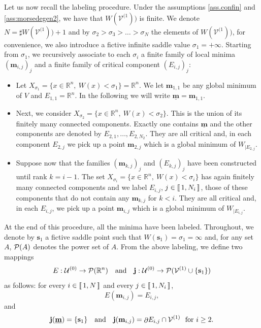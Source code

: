 \documentclass[12pt]{amsart}
\newcommand{\R}{\mathbb R}
\numberwithin{equation}{section}
\numberwithin{figure}{section}
\def\m{\mathbf{m}}
\def\s{\mathbf{s}}
\def\j{\mathbf{j}}
\def\um{\underline{\m}}
\DeclareMathOperator{\p}{\partial}
\newcommand{\lb}{\operatorname{[\negthinspace [}}
\newcommand{\rb}{\operatorname{]\negthinspace ]}}
\def\uuu{{\mathcal U}}\def\vvv{{\mathcal V}}\def\www{{\mathcal W}}\def\xxx{{\mathcal X}}
\begin{document}
Let us now recall the labeling procedure. Under the assumptions \ref{ass.confin} and \ref{ass:morsedegen2}, we have that $W(\vvv^{(1}))$ is finite. We denote $N = \sharp W(\vvv^{(1})) + 1$ and by $\sigma_2 > \sigma_3 > \ldots > \sigma_N$ the elements of $W(\vvv^{(1}))$, for convenience, we also introduce a fictive infinite saddle value $\sigma_1 = +\infty$. Starting from $\sigma_1$, we recursively associate to each $\sigma_i$ a finite family of local minima $(\m_{i,j})_j$ and a finite family of critical component $(E_{i,j})_j$:
\begin{itemize}
    \item Let $X_{\sigma_1} = \{x\in\R^n,\ W(x) < \sigma_1\} = \R^n$. We let $\m_{1,1}$ be any global minimum of $V$ and $E_{1,1} = \R^n$. In the following we will write $\um = \m_{1,1}$.
    \item Next, we consider $X_{\sigma_2} = \{x\in \R^n,\ W(x) < \sigma_2\}$. This is the union of its finitely many connected components. Exactly one contains $\um$ and the other components are denoted by $E_{2,1},\ldots,E_{2,N_2}$. They are all critical and, in each component $E_{2,j}$ we pick up a point $\m_{2,j}$ which is a global minimum of $W_{|E_{2,j}}$.
    \item Suppose now that the families $(\m_{k,j})_j$ and $(E_{k,j})_j$ have been constructed until rank $k = i-1$. The set $X_{\sigma_i} = \{x\in\R^n,\ W(x) < \sigma_i\}$ has again finitely many connected components and we label $E_{i,j}$, $j\in\lb1,N_i\rb$, those of these components that do not contain any $\m_{k,j}$ for $k<i$. They are all critical and, in each $E_{i,j}$, we pick up a point $\m_{i,j}$ which is a global minimum of $W_{|E_{i,j}}$.
\end{itemize}
At the end of this procedure, all the minima have been labeled. Throughout, we denote by $\s_1$ a fictive saddle point such that $W(\s_1) = \sigma_1 = \infty$ and, for any set $A$, ${\mathcal P}(A)$ denotes the power set of $A$. From the above labeling, we define two mappings
\begin{equation*}
E:\uuu^{(0)}\to\ppp(\R^n)\ \ \mbox{ and }\ \ \j:\uuu^{(0)}\to\ppp(\vvv^{(1)}\cup\{\s_1\})
\end{equation*}
as follows: for every $i\in\lb1,N\rb$ and every $j\in\lb1,N_i\rb$,
\begin{equation*}
E(\m_{i,j}) = E_{i,j},
\end{equation*}
and
\begin{equation*}
\j(\um) = \{\s_1\}\ \ \mbox{ and }\ \ \j(\m_{i,j}) = \p\negthinspace E_{i,j}\cap \vvv^{(1)}\ \mbox{ for }i\geq2.
\end{equation*}
\end{document}
